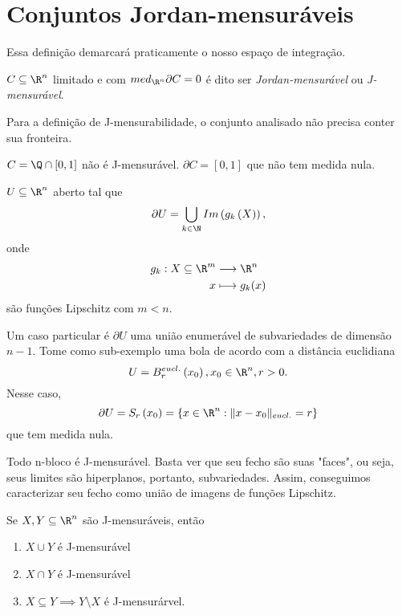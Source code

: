 
\section*{Conjuntos Jordan-mensuráveis}

Essa definição demarcará praticamente o nosso espaço de integração.

\begin{definition}
    $C\subseteq\R^{n}$ limitado e com $med_{\R^{n}}\partial C = 0$ é dito ser \emph{Jordan-mensurável} ou \emph{J-mensurável}.
\end{definition}

\begin{note}
    Para a definição de J-mensurabilidade, o conjunto analisado não precisa conter sua fronteira.
\end{note}

\begin{eg}
    $C = \Q\cap \left[ 0,1 \right] $ não é J-mensurável. $\partial C = \left[ 0,1 \right] $ que não tem medida nula.
\end{eg}

\begin{eg}
    $U\subseteq\R^{n}$ aberto tal que \[
    \partial U = \bigcup_{k\in \N} Im\left( g_k\left( X \right)  \right) 
    ,\] onde
    \begin{align*}
        g_k: X\subseteq\R^{m} &\longrightarrow \R^{n} \\
        x &\longmapsto g_k(x)
    \end{align*}
    são funções Lipschitz com $m<n$.

    Um caso particular é $\partial U$ uma união enumerável de subvariedades de dimensão $n-1$. Tome como sub-exemplo uma bola de acordo com a distância euclidiana \[
    U = B_{r}^{eucl.}\left( x_0 \right) , x_0\in \R^{n}, r>0
    .\] Nesse caso, \[
    \partial U = S_r\left( x_0 \right) = \left\{ x\in \R^{n} : \|x-x_0\|_{eucl.} = r \right\} 
    \] que tem medida nula.
\end{eg}

\begin{eg}
    Todo n-bloco é J-mensurável. Basta ver que seu fecho são suas "faces", ou seja, seus limites são hiperplanos, portanto, subvariedades. Assim, conseguimos caracterizar seu fecho como união de imagens de funções Lipschitz.
\end{eg}

\begin{prop}
    Se $X, Y \subseteq\R^{n}$ são J-mensuráveis, então
    \begin{enumerate}
        \item $X\cup Y$ é J-mensurável \\
	\item $X\cap Y$ é J-mensurável \\
	\item $X\subseteq Y \implies Y\setminus X $ é J-mensurárvel.
    \end{enumerate}
\end{prop}


